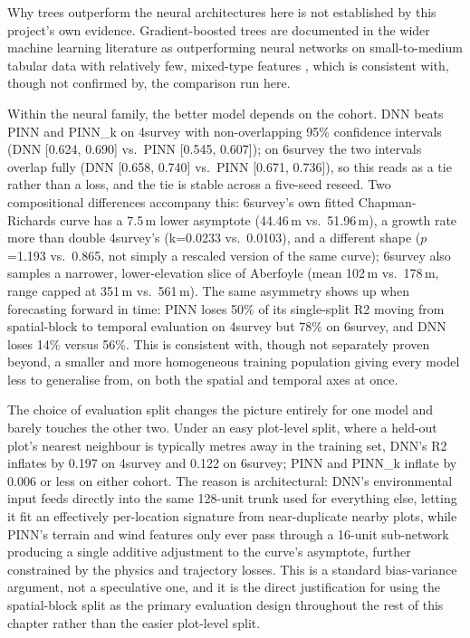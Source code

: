 \documentclass[11pt,a4paper]{report}
\begin{document}
Why trees outperform the neural architectures here is not established by this
project's own evidence. Gradient-boosted trees are documented in the wider machine
learning literature as outperforming neural networks on small-to-medium tabular data
with relatively few, mixed-type features \citep{grinsztajn2022}, which is consistent
with, though not confirmed by, the comparison run here.

Within the neural family, the better model depends on the cohort. DNN beats PINN and
PINN\_k on 4survey with non-overlapping 95\% confidence intervals (DNN
[0.624, 0.690] vs.\ PINN [0.545, 0.607]); on 6survey the two intervals overlap fully
(DNN [0.658, 0.740] vs.\ PINN [0.671, 0.736]), so this reads as a tie rather than a
loss, and the tie is stable across a five-seed reseed. Two compositional differences
accompany this: 6survey's own fitted Chapman-Richards curve has a 7.5\,m lower
asymptote (44.46\,m vs.\ 51.96\,m), a growth rate more than double 4survey's
(k=0.0233 vs.\ 0.0103), and a different shape ($p$=1.193 vs.\ 0.865, not simply a
rescaled version of the same curve); 6survey also samples a narrower, lower-elevation
slice of Aberfoyle (mean 102\,m vs.\ 178\,m, range capped at 351\,m vs.\ 561\,m). The
same asymmetry shows up when forecasting forward in time: PINN loses 50\% of its
single-split R2 moving from spatial-block to temporal evaluation on 4survey but 78\%
on 6survey, and DNN loses 14\% versus 56\%. This is consistent with, though not
separately proven beyond, a smaller and more homogeneous training population giving
every model less to generalise from, on both the spatial and temporal axes at once.

The choice of evaluation split changes the picture entirely for one model and barely
touches the other two. Under an easy plot-level split, where a held-out plot's nearest
neighbour is typically metres away in the training set, DNN's R2 inflates by 0.197 on
4survey and 0.122 on 6survey; PINN and PINN\_k inflate by 0.006 or less on either
cohort. The reason is architectural: DNN's environmental input feeds directly into the
same 128-unit trunk used for everything else, letting it fit an effectively
per-location signature from near-duplicate nearby plots, while PINN's terrain and wind
features only ever pass through a 16-unit sub-network producing a single additive
adjustment to the curve's asymptote, further constrained by the physics and trajectory
losses. This is a standard bias-variance argument, not a speculative one, and it is
the direct justification for using the spatial-block split as the primary evaluation
design throughout the rest of this chapter rather than the easier plot-level split.
\end{document}
